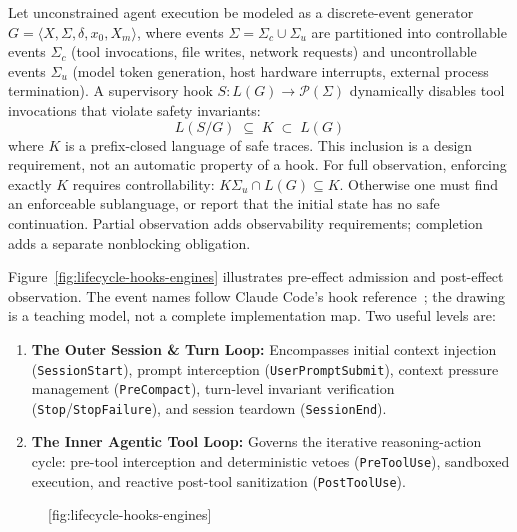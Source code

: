 Let unconstrained agent execution be modeled as a discrete-event generator $G = \langle X, \Sigma, \delta, x_0, X_m \rangle$, where events $\Sigma = \Sigma_c \cup \Sigma_u$ are partitioned into controllable events $\Sigma_c$ (tool invocations, file writes, network requests) and uncontrollable events $\Sigma_u$ (model token generation, host hardware interrupts, external process termination). A supervisory hook $S: L(G) \to \mathcal{P}(\Sigma)$ dynamically disables tool invocations that violate safety invariants:
\begin{equation}
L(S / G) \;\subseteq\; K \;\subset\; L(G)
\end{equation}
where $K$ is a prefix-closed language of safe traces. This inclusion is a design requirement, not an automatic property of a hook. For full observation, enforcing exactly $K$ requires controllability: $K\Sigma_u\cap L(G)\subseteq K$. Otherwise one must find an enforceable sublanguage, or report that the initial state has no safe continuation. Partial observation adds observability requirements; completion adds a separate nonblocking obligation.

Figure~\ref{fig:lifecycle-hooks-engines} illustrates pre-effect admission and
post-effect observation. The event names follow Claude Code's hook
reference~; the drawing is a teaching model, not a
complete implementation map. Two useful levels are:
\begin{enumerate}[leftmargin=1.8em,itemsep=2pt]
  \item \textbf{The Outer Session \& Turn Loop:} Encompasses initial context injection (\texttt{SessionStart}), prompt interception (\texttt{UserPromptSubmit}), context pressure management (\texttt{PreCompact}), turn-level invariant verification (\texttt{Stop}/\texttt{StopFailure}), and session teardown (\texttt{SessionEnd}).
  \item \textbf{The Inner Agentic Tool Loop:} Governs the iterative reasoning-action cycle: pre-tool interception and deterministic vetoes (\texttt{PreToolUse}), sandboxed execution, and reactive post-tool sanitization (\texttt{PostToolUse}).
\end{enumerate}

\begin{figure}[tp]
  \centering
  [fig:lifecycle-hooks-engines]
\end{figure}

